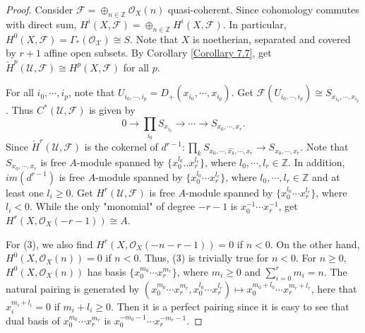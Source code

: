 \documentclass{ctexart}
\begin{document}
\begin{proof}
    Consider $\mathcal{F} = \oplus_{n\in \mathbb{Z}} \mathcal{O}_{X}(n)$ quasi-coherent.
    Since cohomology commutes with direct sum, $H^{i}(X, \mathcal{F}) = \oplus_{n\in \mathbb{Z}} H^{i}(X, \mathcal{F})$.
    In particular, $H^{0}(X, \mathcal{F}) = \Gamma_{\ast}(\mathcal{O_{X}}) \cong S$.
    Note that $X$ is noetherian, separated and covered by $r + 1$ affine open subsets.
    By Corollary \ref{Corollary 7.7}, get $\check{H}^{p}(\mathcal{U}, \mathcal{F}) \cong H^{p}(X, \mathcal{F})$ for all $p$.
    \par
    For all $i_{0}, \cdots, i_{p}$, note that $U_{i_{0}, \cdots, i_{p}} = D_{+}(x_{i_{0}}, \cdots, x_{i_{p}})$.
    Get $\mathcal{F}(U_{i_{0}, \cdots, i_{p}}) \cong S_{x_{i_{0}}, \cdots, x_{i_{p}}}$. 
    Thus $C^{\ast}(\mathcal{U}, \mathcal{F})$ is given by 
    \begin{equation*}
        0 \longrightarrow \prod_{i_{0}} S_{x_{i_{0}}} \longrightarrow \cdots \longrightarrow S_{x_{0}, \cdots, x_{r}}.
    \end{equation*}
    Since $\check{H}^{r}(\mathcal{U}, \mathcal{F})$ is the cokernel of $d^{r - 1}: \prod_{k} S_{x_{0}, \cdots, \widehat{x_{k}}, \cdots, x_{r}} \longrightarrow S_{x_{0}, \cdots, x_{r}}$.
    Note that $S_{x_{0}, \cdots, x_{r}}$ is free $A$-module spanned by $\{x_{0}^{l_{0}}..x_{r}^{l_{r}}\}$, where $l_{0}, \cdots, l_{r}\in \mathbb{Z}$.
    In addition, $im(d^{r - 1})$ is free $A$-module spanned by $\{x_{0}^{l_{0}}\cdots x_{r}^{l_{r}}\}$, where $l_{0}, \cdots, l_{r}\in \mathbb{Z}$ and at least one $l_{i} \ge 0$.
    Get $H^{r}(\mathcal{U}, \mathcal{F})$ is free $A$-module spanned by $\{x_{0}^{l_{0}}\cdots x_{r}^{l_{r}}\}$, where $l_{i} < 0$.
    While the only "monomial" of degree $-r - 1$ is $x_{0}^{-1}\cdots x_{r}^{-1}$, get $H^{r}(X, \mathcal{O}_{X}(-r - 1)) \cong A$.
    \par
    For (3), we also find $H^{r}(X, \mathcal{O}_{X}(-n - r - 1)) = 0$ if $n < 0$.
    On the other hand, $H^{0}(X, \mathcal{O}_{X}(n)) = 0$ if $n < 0$.
    Thus, (3) is trivially true for $n < 0$.
    For $n \ge 0$, $H^{0}(X, \mathcal{O}_{X}(n))$ has basis $\{x_{0}^{{m_{0}}}\cdots x_{r}^{m_{r}}\}$,
    where $m_{i} \ge 0$ and $\sum_{i = 0}^{r} m_{i} = n$.
    The natural pairing is generated by $(x_{0}^{m_{0}}\cdots x_{r}^{m_{r}}, x_{0}^{l_{0}}\cdots x_{r}^{l_{r}}) \longmapsto x_{0}^{m_{0} + l_{0}}\cdots x_{r}^{m_{r} + l_{r}}$,
    here that $x_{i}^{m_{i} + l_{i}} = 0$ if $m_{i} + l_{i} \ge 0$.
    Then it is a perfect pairing since it is easy to see that dual basis of $x_{0}^{m_{0}}\cdots x_{r}^{m_{r}}$ is $x_{0}^{-m_{0} - 1}\cdots x_{r}^{-m_{r} - 1}$.

\end{proof}
\end{document}
